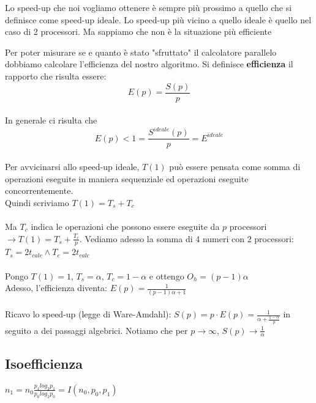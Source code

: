\documentclass{article}
\begin{document}
Lo speed-up che noi vogliamo ottenere è sempre più prossimo a quello che si definisce come speed-up ideale.
Lo speed-up più vicino a quello ideale è quello nel caso di 2 processori. Ma sappiamo che non è la situazione più efficiente

Per poter misurare se e quanto è stato "sfruttato" il calcolatore parallelo dobbiamo calcolare l'efficienza del nostro algoritmo.
Si definisce \textbf{efficienza} il rapporto che risulta essere: $$ E(p) = \frac{S(p)}{p} $$\\
In generale ci risulta che $$ E(p) < 1 = \frac{S^{ideale}(p)}{p} = E^{ideale} $$\\
Per avvicinarsi allo speed-up ideale, $T(1)$ può essere pensata come somma di operazioni eseguite in maniera sequenziale ed operazioni eseguite concorrentemente.\\
Quindi scriviamo $T(1)=T_s + T_c$
\\
\\
Ma $T_c$ indica le operazioni che possono essere eseguite da $p$ processori $\rightarrow T(1)= T_s + \frac{T_c}{p}$.
Vediamo adesso la somma di 4 numeri con 2 processori:\\
$T_s = 2t_{calc} \wedge T_c = 2t_{calc}$
\\
\\
Pongo $T(1)=1$, $T_s=\alpha$, $T_c = 1-\alpha$ e ottengo $O_h = (p-1)\alpha$\\
Adesso, l'efficienza diventa:
$E(p)=\frac{1}{(p-1)\alpha + 1}$
\\
\\
Ricavo lo speed-up (legge di Ware-Amdahl):
$S(p)=p\cdot E(p)=\frac{1}{\alpha + \frac{1-\alpha}{p}}$ in seguito a dei passaggi algebrici.
Notiamo che per $p\rightarrow \infty$, $S(p)\rightarrow \frac{1}{\alpha}$

\subsection{Isoefficienza}


$n_1 = n_0\frac{p_{1} log_{2} p_{1}}{p_{0} log_{2} p_{0}} = I(n_{0}, p_{0}, p_{1})$
\end{document}
